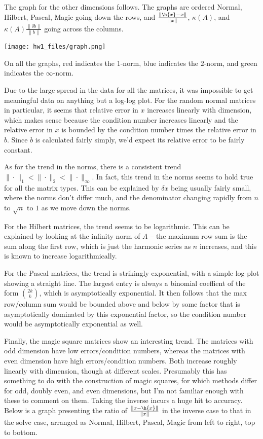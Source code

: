 \documentclass{article}
\begin{document}
The graph for the other dimensions follows. The graphs are ordered Normal, Hilbert, Pascal, Magic going down the rows, and $\frac{\|\h{x}-x\|}{\|x\|}$, $\kappa(A)$, and $\kappa(A)\frac{\|\delta b\|}{\|b\|}$ going across the columns. 

\texttt{[image: hw1\_files/graph.png]}

On all the graphs, red indicates the $1$-norm, blue indicates the $2$-norm, and green indicates the $\infty$-norm.

Due to the large spread in the data for all the matrices, it was impossible to get meaningful data on anything but a log-log plot. For the random normal matrices in particular, it seems that relative error in $x$ increases linearly with dimension, which makes sense because the condition number increases linearly and the relative error in $x$ is bounded by the condition number times the relative error in $b$. Since $b$ is calculated fairly simply, we'd expect its relative error to be fairly constant. 

As for the trend in the norms, there is a consistent trend $\|\cdot\|_1<\|\cdot\|_2<\|\cdot\|_\infty$. In fact, this trend in the norms seems to hold true for all the matrix types. This can be explained by $\delta x$ being usually fairly small, where the norms don't differ much, and the denominator changing rapidly from $n$ to $\sqrt{n}$ to $1$ as we move down the norms. 

For the Hilbert matrices, the trend seems to be logarithmic. This can be explained by looking at the infinity norm of $A$ -- the maximum row sum is the sum along the first row, which is just the harmonic series as $n$ increases, and this is known to increase logarithmically.

For the Pascal matrices, the trend is strikingly exponential, with a simple log-plot showing a straight line. The largest entry is always a binomial coeffient of the form $\binom{2k}{k}$, which is asymptotically exponential. It then follows that the max row/column sum would be bounded above and below by some factor that is asymptotically dominated by this exponential factor, so the condition number would be asymptotically exponential as well.

Finally, the magic square matrices show an interesting trend. The matrices with odd dimension have low errors/condition numbers, whereas the matrices with even dimension have high errors/condition numbers. Both increase roughly linearly with dimension, though at different scales. Presumably this has something to do with the construction of magic squares, for which methods differ for odd, doubly even, and even dimensions, but I'm not familiar enough with these to comment on them.
Taking the inverse incurs a huge hit to accuracy. Below is a graph presenting the ratio of $\frac{\|x-\h{x}\|}{\|x\|}$ in the inverse case to that in the solve case, arranged as Normal, Hilbert, Pascal, Magic from left to right, top to bottom.
\end{document}
